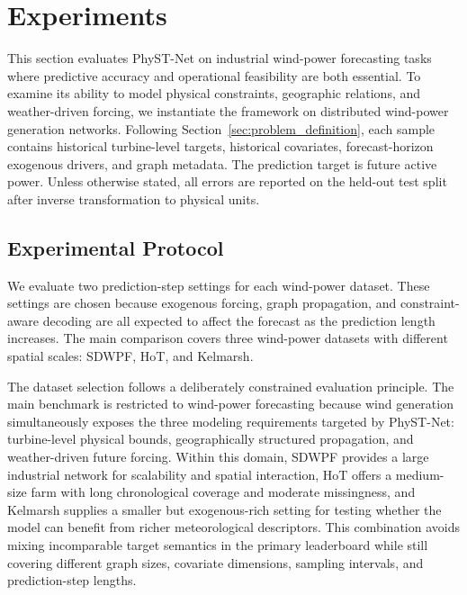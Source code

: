 \section{Experiments}
\label{sec:experiments}

This section evaluates PhyST-Net on industrial wind-power forecasting tasks where predictive accuracy and operational feasibility are both essential. To examine its ability to model physical constraints, geographic relations, and weather-driven forcing, we instantiate the framework on distributed wind-power generation networks. Following Section~\ref{sec:problem_definition}, each sample contains historical turbine-level targets, historical covariates, forecast-horizon exogenous drivers, and graph metadata. The prediction target is future active power. Unless otherwise stated, all errors are reported on the held-out test split after inverse transformation to physical units.

\subsection{Experimental Protocol}
\label{sec:experimental_protocol}

We evaluate two prediction-step settings for each wind-power dataset. These settings are chosen because exogenous forcing, graph propagation, and constraint-aware decoding are all expected to affect the forecast as the prediction length increases. The main comparison covers three wind-power datasets with different spatial scales: SDWPF, HoT, and Kelmarsh.

The dataset selection follows a deliberately constrained evaluation principle. The main benchmark is restricted to wind-power forecasting because wind generation simultaneously exposes the three modeling requirements targeted by PhyST-Net: turbine-level physical bounds, geographically structured propagation, and weather-driven future forcing. Within this domain, SDWPF provides a large industrial network for scalability and spatial interaction, HoT offers a medium-size farm with long chronological coverage and moderate missingness, and Kelmarsh supplies a smaller but exogenous-rich setting for testing whether the model can benefit from richer meteorological descriptors. This combination avoids mixing incomparable target semantics in the primary leaderboard while still covering different graph sizes, covariate dimensions, sampling intervals, and prediction-step lengths.

